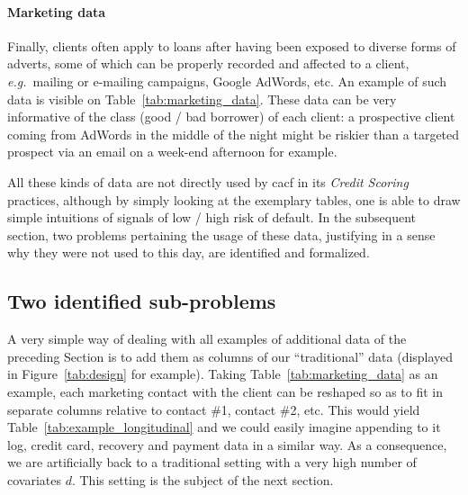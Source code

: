 \paragraph{Marketing data}

Finally, clients often apply to loans after having been exposed to diverse forms of adverts, some of which can be properly recorded and affected to a client, \textit{e.g.}\ mailing or e-mailing campaigns, Google AdWords, etc. An example of such data is visible on Table~\ref{tab:marketing_data}. These data can be very informative of the class (good / bad borrower) of each client: a prospective client coming from AdWords in the middle of the night might be riskier than a targeted prospect via an email on a week-end afternoon for example.

\begin{table}[ht]
    \centering
    \caption{Marketing data.}
    \label{tab:marketing_data}
\begin{tiny}
\end{tiny}
\end{table}

All these kinds of data are not directly used by \gls{cacf} in its \textit{Credit Scoring} practices, although by simply looking at the exemplary tables, one is able to draw simple intuitions of signals of low / high risk of default. In the subsequent section, two problems pertaining the usage of these data, justifying in a sense why they were not used to this day, are identified and formalized.


\subsection{Two identified sub-problems}

A very simple way of dealing with all examples of additional data of the preceding Section is to add them as columns of our ``traditional'' data (displayed in Figure~\ref{tab:design} for example). Taking Table~\ref{tab:marketing_data} as an example, each marketing contact with the client can be reshaped so as to fit in separate columns relative to contact \#1, contact \#2, etc. This would yield Table~\ref{tab:example_longitudinal} and we could easily imagine appending to it log, credit card, recovery and payment data in a similar way. As a consequence, we are artificially back to a traditional setting with a very high number of covariates $d$. This setting is the subject of the next section. 


